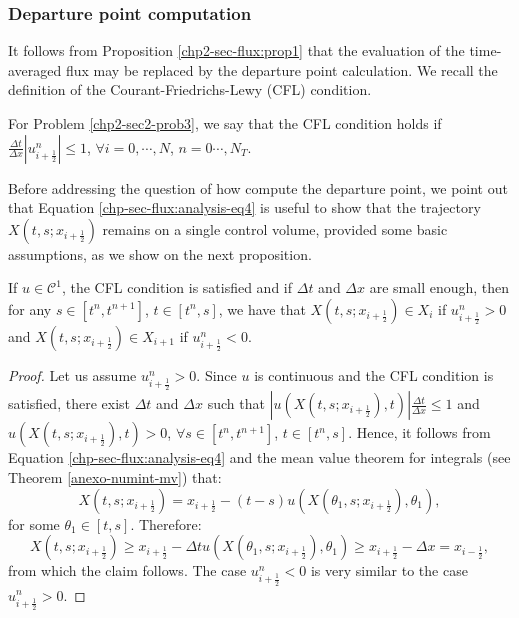 \subsubsection{Departure point computation}
It follows from Proposition \ref{chp2-sec-flux:prop1} that  the evaluation of the time-averaged flux
may be replaced by the departure point calculation.
We recall the definition of the Courant-Friedrichs-Lewy (CFL) condition.
\begin{definition}
	\label{chp2-sec-flux:CFL}
	For Problem \ref{chp2-sec2-prob3}, we say that the CFL condition holds if $\frac{\Delta t}{\Delta x} |u^n_{i+\frac{1}{2}}| \leq 1$, $\forall i=0, \cdots, N$, $n=0\cdots,N_T$.
\end{definition}
Before addressing the question of how compute the departure point, we point out that Equation \eqref{chp-sec-flux:analysis-eq4} is useful to 
show that the trajectory $X(t,s;x_{i+\frac{1}{2}})$ remains on a single control volume,
provided some basic assumptions, as we show on the next proposition.
\begin{prop}
	\label{chp2-sec-flux:departurebound}
	If $u \in \mathcal{C}^1$, the CFL condition is satisfied and if $\Delta t$ and $\Delta x$ are small enough, then
	for any $s \in [t^n, t^{n+1}]$, $t \in [t^n, s]$, we have that $X(t,s;x_{i+\frac{1}{2}}) \in X_i$ if $u_{i+\frac{1}{2}}^n>0$ 
	and	$X(t,s;x_{i+\frac{1}{2}}) \in X_{i+1}$ if $u_{i+\frac{1}{2}}^n<0$.
\end{prop}
\begin{proof}
	Let us assume $u_{i+\frac{1}{2}}^n>0$. Since $u$ is continuous and the CFL condition is satisfied,
	there exist $\Delta t$ and $\Delta x$ such that $|u(X(t,s;x_{i+\frac{1}{2}}),t)| \frac{\Delta t}{\Delta x}\leq1$ and $u(X(t,s;x_{i+\frac{1}{2}}),t)>0$, 
	$\forall s \in [t^n, t^{n+1}]$, $t \in [t^n, s]$.
	Hence, it follows from Equation \eqref{chp-sec-flux:analysis-eq4} and the mean value theorem for integrals
	(see Theorem \ref{anexo-numint-mv}) that:
	\begin{equation*}
		X(t,s;x_{i+\frac{1}{2}}) = x_{i+\frac{1}{2}} - (t-s)u(X(\theta_1,s;x_{i+\frac{1}{2}}),\theta_1),
	\end{equation*}
	for some $\theta_1 \in [t,s]$. Therefore:
	\begin{equation*}
		X(t,s;x_{i+\frac{1}{2}}) \geq x_{i+\frac{1}{2}} - \Delta t u(X(\theta_1,s;x_{i+\frac{1}{2}}),\theta_1)
		\geq x_{i+\frac{1}{2}} - \Delta x = x_{i-\frac{1}{2}},
	\end{equation*}
	from which the claim follows.
	The case $u_{i+\frac{1}{2}}^n<0$  is very similar to the case  $u_{i+\frac{1}{2}}^n>0$.
\end{proof}
